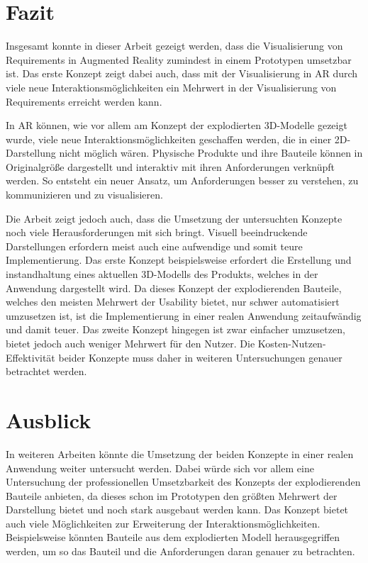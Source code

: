 \section{Fazit}

Insgesamt konnte in dieser Arbeit gezeigt werden, dass die Visualisierung von Requirements in Augmented Reality zumindest in einem Prototypen umsetzbar ist.
Das erste Konzept zeigt dabei auch, dass mit der Visualisierung in AR durch viele neue Interaktionsmöglichkeiten ein Mehrwert in der Visualisierung von Requirements erreicht werden kann.

In AR können, wie vor allem am Konzept der explodierten 3D-Modelle gezeigt wurde, viele neue Interaktionsmöglichkeiten geschaffen werden, die in einer 2D-Darstellung nicht möglich wären.
Physische Produkte und ihre Bauteile können in Originalgröße dargestellt und interaktiv mit ihren Anforderungen verknüpft werden.
So entsteht ein neuer Ansatz, um Anforderungen besser zu verstehen, zu kommunizieren und zu visualisieren.

Die Arbeit zeigt jedoch auch, dass die Umsetzung der untersuchten Konzepte noch viele Herausforderungen mit sich bringt.
Visuell beeindruckende Darstellungen erfordern meist auch eine aufwendige und somit teure Implementierung.
Das erste Konzept beispielsweise erfordert die Erstellung und instandhaltung eines aktuellen 3D-Modells des Produkts, welches in der Anwendung dargestellt wird.
Da dieses Konzept der explodierenden Bauteile, welches den meisten Mehrwert der Usability bietet, nur schwer automatisiert umzusetzen ist, ist die Implementierung in einer realen Anwendung zeitaufwändig und damit teuer.
Das zweite Konzept hingegen ist zwar einfacher umzusetzen, bietet jedoch auch weniger Mehrwert für den Nutzer.
Die Kosten-Nutzen-Effektivität beider Konzepte muss daher in weiteren Untersuchungen genauer betrachtet werden.


\section{Ausblick}

In weiteren Arbeiten könnte die Umsetzung der beiden Konzepte in einer realen Anwendung weiter untersucht werden.
Dabei würde sich vor allem eine Untersuchung der professionellen Umsetzbarkeit des Konzepts der explodierenden Bauteile anbieten, da dieses schon im Prototypen den größten Mehrwert der Darstellung bietet und noch stark ausgebaut werden kann.
Das Konzept bietet auch viele Möglichkeiten zur Erweiterung der Interaktionsmöglichkeiten.
Beispielsweise könnten Bauteile aus dem explodierten Modell herausgegriffen werden, um so das Bauteil und die Anforderungen daran genauer zu betrachten.
